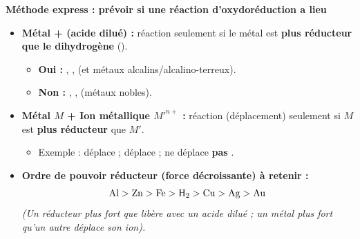 \documentclass[11pt]{article}
\begin{document}
\begin{bilan}
\textbf{Méthode express : prévoir si une réaction d'oxydoréduction a lieu}
\begin{itemize}
  \item \textbf{Métal +  (acide dilué) :} réaction seulement si le métal est \textbf{plus réducteur que le dihydrogène} ().
  \begin{itemize}
    \item \textbf{Oui :} , ,  (et métaux alcalins/alcalino-terreux).
    \item \textbf{Non :} , ,  (métaux nobles).
  \end{itemize}
  \item \textbf{Métal $M$ + Ion métallique $M'^{n+}$ :} réaction (déplacement) seulement si $M$ est \textbf{plus réducteur} que $M'$.
  \begin{itemize}
    \item Exemple :  déplace  ;  déplace  ;  ne déplace \textbf{pas} .
  \end{itemize}
  \item \textbf{Ordre de pouvoir réducteur (force décroissante) à retenir :}
  \[ \ce{Al} > \ce{Zn} > \ce{Fe} > \ce{H2} > \ce{Cu} > \ce{Ag} > \ce{Au} \]
  \emph{(Un réducteur plus fort que  libère  avec un acide dilué ; un métal plus fort qu'un autre déplace son ion).}
\end{itemize}
\end{bilan}
\end{document}
